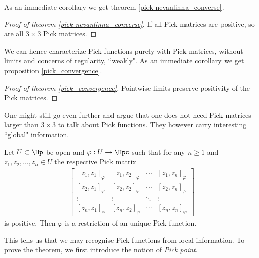As an immediate corollary we get theorem \ref{pick-nevanlinna_converse}.

\begin{proof}[Proof of theorem \ref{pick-nevanlinna_converse}]
If all Pick matrices are positive, so are all $3 \times 3$ Pick matrices.
\end{proof}

We can hence characterize Pick functions purely with Pick matrices, without limits and concerns of regularity, ``weakly". As an immediate corollary we get proposition \ref{pick_convergence}.

\begin{proof}[Proof of theorem \ref{pick_convergence}]
Pointwise limits preserve positivity of the Pick matrices.
\end{proof}

One might still go even further and argue that one does not need Pick matrices larger than $3 \times 3$ to talk about Pick functions. They however carry interesting ``global" information.

\begin{lause}\label{open_pick_nevanlinna}
	Let $U \subset \Hp$ be open and $\varphi : U \to \Hpc$ such that for any $n \geq 1$ and $z_{1}, z_{2}, \ldots, z_{n} \in U$ the respective Pick matrix
	\begin{align*}
	\begin{bmatrix}
		[z_{1}, \overline{z_{1}}]_{\varphi} & [z_{1}, \overline{z_{2}}]_{\varphi} & \cdots & [z_{1}, \overline{z_{n}}]_{\varphi} \\
		[z_{2}, \overline{z_{1}}]_{\varphi} & [z_{2}, \overline{z_{2}}]_{\varphi} & \cdots & [z_{2}, \overline{z_{n}}]_{\varphi} \\
		\vdots & \vdots & \ddots & \vdots \\
		[z_{n}, \overline{z_{1}}]_{\varphi} & [z_{n}, \overline{z_{2}}]_{\varphi} & \cdots &  [z_{n}, \overline{z_{n}}]_{\varphi}
	\end{bmatrix}
	\end{align*}
	is positive. Then $\varphi$ is a restriction of an unique Pick function.
\end{lause}

This tells us that we may recognise Pick functions from local information. To prove the theorem, we first introduce the notion of \textit{Pick point}.

